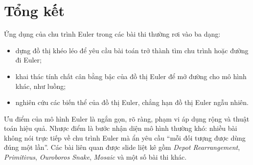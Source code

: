 \documentclass[11pt]{article}
\begin{document}
\section{Tổng kết}

Ứng dụng của chu trình Euler trong các bài thi thường rơi vào ba dạng:
\begin{itemize}
  \item dựng đồ thị khéo léo để yêu cầu bài toán trở thành tìm chu trình hoặc
  đường đi Euler;
  \item khai thác tính chất cân bằng bậc của đồ thị Euler để mở đường cho mô
  hình khác, như luồng;
  \item nghiên cứu các biến thể của đồ thị Euler, chẳng hạn đồ thị Euler ngẫu
  nhiên.
\end{itemize}

Ưu điểm của mô hình Euler là ngắn gọn, rõ ràng, phạm vi áp dụng rộng và thuật
toán hiệu quả. Nhược điểm là bước nhận diện mô hình thường khó: nhiều bài
không nói trực tiếp về chu trình Euler mà ẩn yêu cầu ``mỗi đối tượng được dùng
đúng một lần''. Các bài liên quan được slide liệt kê gồm
\textit{Depot Rearrangement}, \textit{Primitivus}, \textit{Ouroboros Snake},
\textit{Mosaic} và một số bài thi khác.
\end{document}
